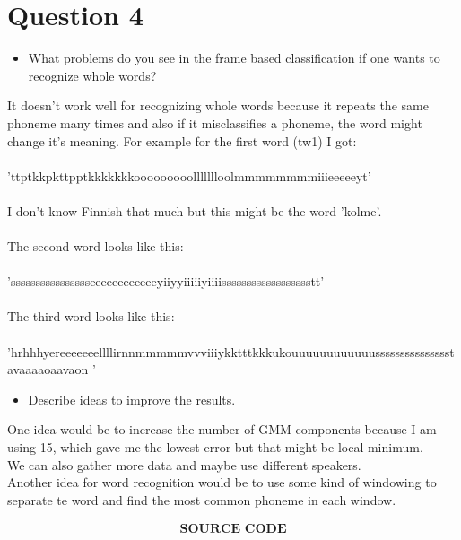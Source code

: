 \documentclass[17pt]{article}
\begin{document}
\section{Question 4}
\begin{itemize}
	\item{What problems do you see in the frame based classification if one wants to recognize whole words?}
\end{itemize}
It doesn't work well for recognizing whole words because it repeats the same phoneme many times and also if it misclassifies a phoneme, the word might change it's meaning.
For example for the first word (tw1) I got: \\~\\
'ttptkkpkttpptkkkkkkkooooooooollllllloolmmmmmmmmiiieeeeeyt' \\~\\
I don't know Finnish that much but this might be the word 'kolme'. \\~\\
The second word looks like this: \\~\\
'sssssssssssssssseeeeeeeeeeeeyiiyyiiiiiyiiiisssssssssssssssssstt'
\\~\\
The third word looks like this: \\~\\
'hrhhhyereeeeeeellllirnnmmmmmvvviiiykktttkkkukouuuuuuuuuuuussssssssssssssstavaaaaoaavaon
'

\begin{itemize}
	\item{Describe ideas to improve the results.}
\end{itemize}
One idea would be to increase the number of GMM components because I am using 15, which gave me the lowest error but that might be local minimum. \\
We can also gather more data and maybe use different speakers.
\\
Another idea for word recognition would be to use some kind of windowing to separate te word and find the most common phoneme in each window.



\begin{align}
\textbf{SOURCE CODE}
\end{align}
\end{document}
